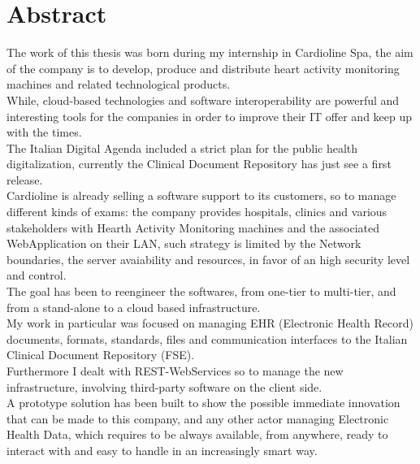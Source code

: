 \chapter*{Abstract} %
\label{sommario}

The work of this thesis was born during my internship in Cardioline Spa, the aim of the company is to develop, produce and distribute heart activity monitoring machines and related technological products.\\While, cloud-based technologies and software interoperability are powerful and interesting tools for the companies in order to improve their IT offer and keep up with the times.\\The Italian Digital Agenda included a strict plan for the public health digitalization, currently the Clinical Document Repository has just see a first release.\\Cardioline is already selling a software support to its customers, so to manage different kinds of exams: the company provides hospitals, clinics and various stakeholders with Hearth Activity Monitoring machines and the associated WebApplication on their LAN, such strategy is limited by the Network boundaries, the server avaiability and resources, in favor of an high security level and control.\\The goal has been to reengineer the softwares, from one-tier to multi-tier, and from a stand-alone to a cloud based infrastructure.\\My work in particular was focused on managing EHR (Electronic Health Record) documents, formats, standards, files and communication interfaces to the Italian Clinical Document Repository (FSE).\\Furthermore I dealt with REST-WebServices so to manage the new infrastructure, involving third-party software on the client side.\\A prototype solution has been built to show the possible immediate innovation that can be made to this company, and any other actor managing Electronic Health Data, which requires to be always available, from anywhere, ready to interact with and easy to handle in an increasingly smart way.